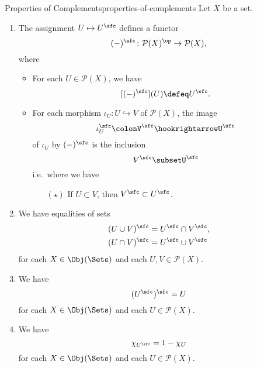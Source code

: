 \begin{proposition}{Properties of Complements}{properties-of-complements}%
    Let $X$ be a set.
    \begin{enumerate}
        \item\label{properties-of-complements-functoriality}The assignment $U\mapsto U^{\sfc}$ defines a functor%
            \[
                (-)^{\sfc}%
                \colon%
                \mathcal{P}(X)^{\op}%
                \to%
                \mathcal{P}(X),%
            \]%
            where
            \begin{itemize}
                \item{}For each $U\in\mathcal{P}(X)$, we have
                    \[
                        [(-)^{\sfc}](U)
                        \defeq
                        U^{\sfc}.
                    \]%
                \item{}For each morphism $\iota_{U}\colon U\hookrightarrow V$ of $\mathcal{P}(X)$, the image
                    \[
                        \iota^{\sfc}_{U}%
                        \colon%
                        V^{\sfc}%
                        \hookrightarrow%
                        U^{\sfc}%
                    \]%
                    of $\iota_{U}$ by $(-)^{\sfc}$ is the inclusion
                    \[
                        V^{\sfc}%
                        \subset%
                        U^{\sfc}%
                    \]%
                    i.e.\ where we have
                    \begin{itemize}
                        \item[$(\star)$]If $U\subset V$, then $V^{\sfc}\subset U^{\sfc}$.
                    \end{itemize}
            \end{itemize}
        \item\label{properties-of-complements-de-morgan-s-laws}We have equalities of sets%
            \begin{align*}
                (U\cup V)^{\sfc} &= U^{\sfc}\cap V^{\sfc},\\
                (U\cap V)^{\sfc} &= U^{\sfc}\cup V^{\sfc}
            \end{align*}
            for each $X\in\Obj(\Sets)$ and each $U,V\in\mathcal{P}(X)$.
        \item\label{properties-of-complements-involutority}We have
            \[
                (U^{\sfc})^{\sfc}%
                =%
                U%
            \]%
            for each $X\in\Obj(\Sets)$ and each $U\in\mathcal{P}(X)$.
        \item\label{properties-of-complements-interaction-with-characteristic-functions}We have
            \[
                \chi_{U^{\sfc}}%
                =%
                1-\chi_{U}%
            \]%
            for each $X\in\Obj(\Sets)$ and each $U\in\mathcal{P}(X)$.
    \end{enumerate}
\end{proposition}
